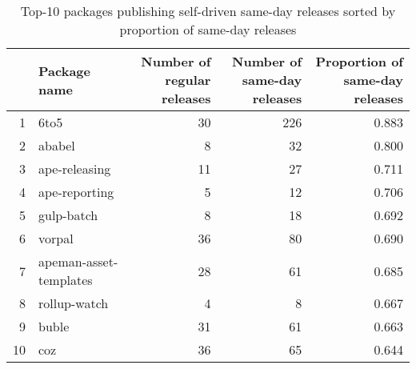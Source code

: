 \documentclass[11pt, oneside]{article}   	%
\begin{document}
\begin{table}[ht]
\centering
\begin{tabular}{rlrrr}
  \hline
 & \pbox{20cm}{Package \\name} & \pbox{20cm}{Number of \\regular releases} & \pbox{20cm}{Number of \\same-day releases} & \pbox{20cm}{Proportion of \\same-day releases} \\ 
  \hline
1 & 6to5 & 30 & 226 & 0.883 \\ 
  2 & ababel & 8 & 32 & 0.800 \\ 
  3 & ape-releasing & 11 & 27 & 0.711 \\ 
  4 & ape-reporting & 5 & 12 & 0.706 \\ 
  5 & gulp-batch & 8 & 18 & 0.692 \\ 
  6 & vorpal & 36 & 80 & 0.690 \\ 
  7 & apeman-asset-templates & 28 & 61 & 0.685 \\ 
  8 & rollup-watch & 4 & 8 & 0.667 \\ 
  9 & buble & 31 & 61 & 0.663 \\ 
  10 & coz & 36 & 65 & 0.644 \\ 
   \hline
\end{tabular}
\caption{Top-10 packages publishing self-driven same-day releases sorted by proportion of same-day releases} 
\end{table}
\end{document}
